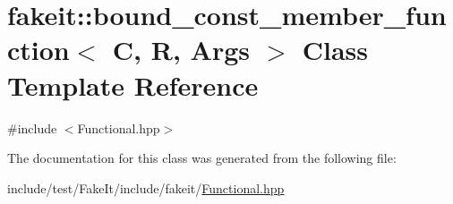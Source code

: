 \hypertarget{classfakeit_1_1bound__const__member__function}{}\section{fakeit\+::bound\+\_\+const\+\_\+member\+\_\+function$<$ C, R, Args $>$ Class Template Reference}
\label{classfakeit_1_1bound__const__member__function}


{\ttfamily \#include $<$Functional.\+hpp$>$}



The documentation for this class was generated from the following file\+:\begin{DoxyCompactItemize}
\item 
include/test/\+Fake\+It/include/fakeit/\mbox{\hyperlink{Functional_8hpp}{Functional.\+hpp}}\end{DoxyCompactItemize}
